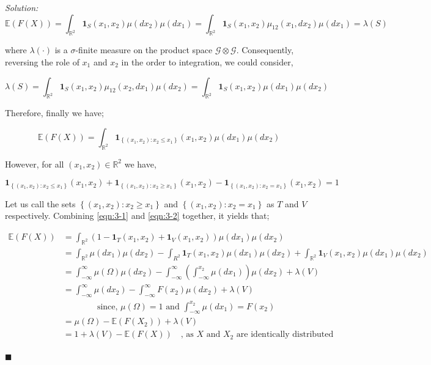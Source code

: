 \documentclass[12pt]{article}
\newcommand{\R}{\mathbb{R}}
\newcommand{\E}{\mathbb{E}}
\theoremstyle{definition}
\newenvironment{answer}{\textit{Solution: }\quad }{ \hfill $\blacksquare$}
\begin{document}
\begin{answer}
	$$\E(F(X)) = \int_{\R^2} \bm{1}_{S}(x_1, x_2) \mu(dx_2) \mu(dx_1) = \int_{\R^2} \bm{1}_{S}(x_1,x_2) \mu_{12}(x_1, dx_2) \mu(dx_1) = \lambda(S)$$

	where $\lambda(\cdot)$ is a $\sigma$-finite measure on the product space $\mathcal{G} \otimes \mathcal{G}$. Consequently, reversing the role of $x_1$ and $x_2$ in the order to integration, we could consider,

	$$\lambda(S) = \int_{\R^2} \bm{1}_{S}(x_1, x_2) \mu_{12}(x_2, dx_1) \mu(dx_2) = \int_{\R^2} \bm{1}_{S}(x_1, x_2) \mu(dx_1) \mu(dx_2)$$

	Therefore, finally we have;

	\begin{equation}
		\E(F(X)) = \int_{\R^2} \bm{1}_{\left\{ (x_1, x_2) : x_2 \leq x_1 \right\}}(x_1, x_2) \mu(dx_1) \mu(dx_2)
		\label{eqn:3-1}
	\end{equation}

	However, for all $(x_1, x_2) \in \R^2$ we have,

	\begin{equation}
		\bm{1}_{ \left\{ (x_1, x_2) : x_2 \leq x_1 \right\} }(x_1, x_2) +
		\bm{1}_{ \left\{ (x_1, x_2) : x_2 \geq x_1 \right\} }(x_1, x_2) -
		\bm{1}_{ \left\{ (x_1, x_2) : x_2 = x_1 \right\} }(x_1, x_2) = 1
		\label{eqn:3-2}
	\end{equation}

	Let us call the sets $\left\{ (x_1, x_2) : x_2 \geq x_1 \right\}$ and $\left\{ (x_1, x_2) : x_2 = x_1 \right\}$ as $T$ and $V$ respectively. Combining \cref{eqn:3-1} and \cref{eqn:3-2} together, it yields that;

	\begin{align*}
		\E(F(X))
		& = \int_{\R^2} \left( 1 - \bm{1}_T(x_1, x_2) + \bm{1}_V (x_1, x_2) \right) \mu(dx_1) \mu(dx_2)\\
		& = \int_{\R^2} \mu(dx_1) \mu(dx_2) - \int_{R^2} \bm{1}_T(x_1, x_2) \mu(dx_1) \mu(dx_2) + \int_{\R^2} \bm{1}_V(x_1, x_2) \mu(dx_1) \mu(dx_2)\\
		& = \int_{-\infty}^{\infty} \mu(\Omega) \mu(dx_2) - \int_{-\infty}^{\infty} \left(\int_{-\infty}^{x_2} \mu(dx_1)\right) \mu(dx_2) + \lambda(V)\\
		& = \int_{-\infty}^{\infty} \mu(dx_2) - \int_{-\infty}^{\infty} F(x_2) \mu(dx_2) + \lambda(V)\\
		& \qquad \qquad \text{since, } \mu(\Omega) = 1 \text{ and } \int_{-\infty}^{x_2} \mu(dx_1) = F(x_2)\\
		& = \mu(\Omega) - \E(F(X_2)) + \lambda(V)\\
		& = 1 + \lambda(V) - \E(F(X)) \quad \text{, as } X \text{ and } X_2 \text{ are identically distributed}\\
	\end{align*}


\end{answer}
\end{document}
